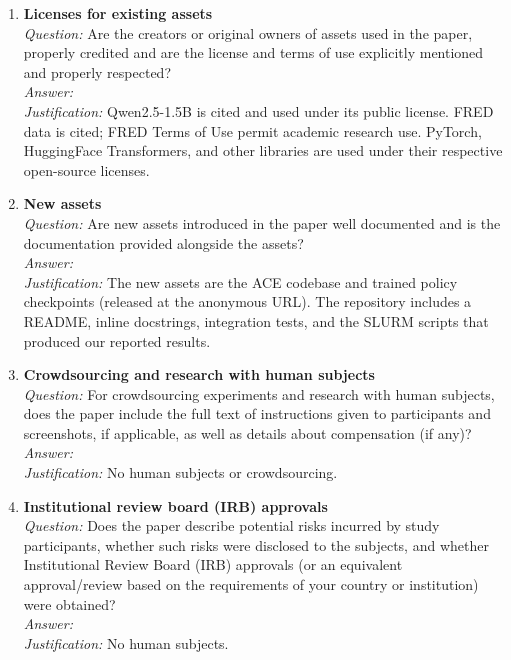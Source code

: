 \begin{enumerate}
\item \textbf{Licenses for existing assets}\\
\emph{Question:} Are the creators or original owners of assets used in the paper, properly credited and are the license and terms of use explicitly mentioned and properly respected?\\
\emph{Answer:} \answerYes{}\\
\emph{Justification:} Qwen2.5-1.5B is cited and used under its public license. FRED data is cited; FRED Terms of Use permit academic research use. PyTorch, HuggingFace Transformers, and other libraries are used under their respective open-source licenses.

\item \textbf{New assets}\\
\emph{Question:} Are new assets introduced in the paper well documented and is the documentation provided alongside the assets?\\
\emph{Answer:} \answerYes{}\\
\emph{Justification:} The new assets are the ACE codebase and trained policy checkpoints (released at the anonymous URL). The repository includes a README, inline docstrings, integration tests, and the SLURM scripts that produced our reported results.

\item \textbf{Crowdsourcing and research with human subjects}\\
\emph{Question:} For crowdsourcing experiments and research with human subjects, does the paper include the full text of instructions given to participants and screenshots, if applicable, as well as details about compensation (if any)?\\
\emph{Answer:} \answerNA{}\\
\emph{Justification:} No human subjects or crowdsourcing.

\item \textbf{Institutional review board (IRB) approvals}\\
\emph{Question:} Does the paper describe potential risks incurred by study participants, whether such risks were disclosed to the subjects, and whether Institutional Review Board (IRB) approvals (or an equivalent approval/review based on the requirements of your country or institution) were obtained?\\
\emph{Answer:} \answerNA{}\\
\emph{Justification:} No human subjects.


\end{enumerate}
